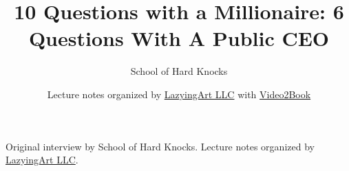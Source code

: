 \documentclass[11pt,oneside]{book}
\begin{document}
\frontmatter
\title{10 Questions with a Millionaire: 6 Questions With A Public CEO}
\author{School of Hard Knocks}
\date{Lecture notes organized by \href{https://lazying.art}{LazyingArt LLC} with \href{https://github.com/lachlanchen/Video2Book}{Video2Book}}
\maketitle
\begin{center}
\small Original interview by School of Hard Knocks. Lecture notes organized by \href{https://lazying.art}{LazyingArt LLC}.
\end{center}
\clearpage
\mainmatter

\end{document}
